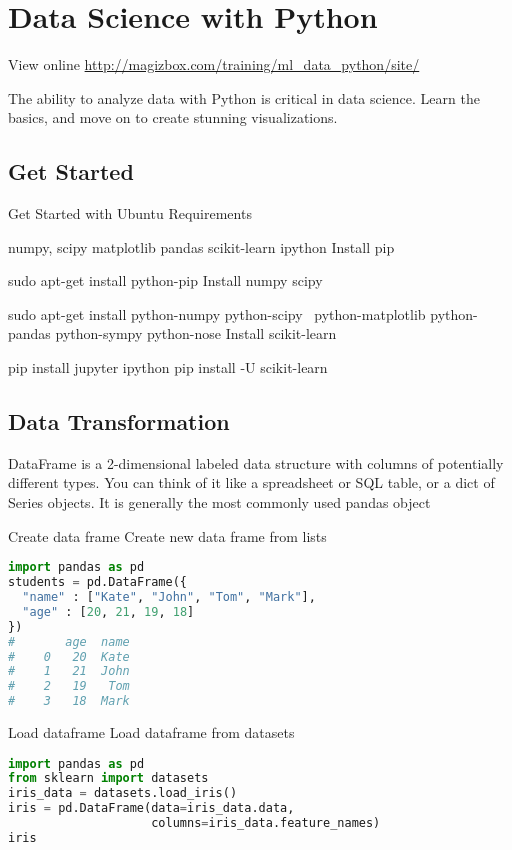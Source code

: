 \chapter{Data Science with Python}

View online \href{http://magizbox.com/training/ml_data_python/site/}{http://magizbox.com/training/ml_data_python/site/}

The ability to analyze data with Python is critical in data science. Learn the basics, and move on to create stunning visualizations.

\section{Get Started}

Get Started with Ubuntu
Requirements

numpy, scipy
matplotlib
pandas
scikit-learn
ipython
Install pip

sudo apt-get install python-pip
Install numpy scipy

sudo apt-get install python-numpy python-scipy \
    python-matplotlib python-pandas python-sympy python-nose
Install scikit-learn

pip install jupyter ipython pip install -U scikit-learn

\section{Data Transformation}

DataFrame is a 2-dimensional labeled data structure with columns of potentially different types. You can think of it like a spreadsheet or SQL table, or a dict of Series objects. It is generally the most commonly used pandas object

Create data frame
Create new data frame from lists

\begin{lstlisting}[language=Python]
import pandas as pd
students = pd.DataFrame({
  "name" : ["Kate", "John", "Tom", "Mark"],
  "age" : [20, 21, 19, 18]
})
#       age  name
#    0   20  Kate
#    1   21  John
#    2   19   Tom
#    3   18  Mark
\end{lstlisting}

Load dataframe
Load dataframe from datasets


\begin{lstlisting}[language=Python]
import pandas as pd
from sklearn import datasets
iris_data = datasets.load_iris()
iris = pd.DataFrame(data=iris_data.data,
                    columns=iris_data.feature_names)
iris

\end{lstlisting}

